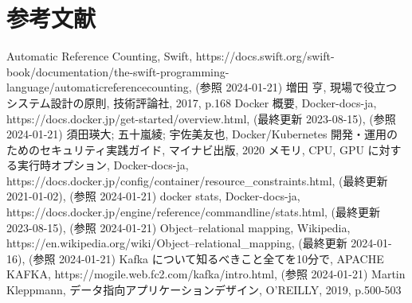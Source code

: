 \documentclass[../../main]{subfiles}
\begin{document}
    \section{参考文献}\label{sec:reference}

    \begin{thebibliography}{99}
         Automatic Reference Counting, Swift, https://docs.swift.org/swift-book/documentation/the-swift-programming-language/automaticreferencecounting, (参照 2024-01-21)
         増田 亨, 現場で役立つシステム設計の原則, 技術評論社, 2017, p.168
         Docker 概要, Docker-docs-ja, https://docs.docker.jp/get-started/overview.html, (最終更新 2023-08-15), (参照 2024-01-21)
         須田瑛大; 五十嵐綾; 宇佐美友也, Docker/Kubernetes 開発・運用のためのセキュリティ実践ガイド, マイナビ出版, 2020
         メモリ, CPU, GPU に対する実行時オプション, Docker-docs-ja, https://docs.docker.jp/config/container/resource\_constraints.html, (最終更新 2021-01-02), (参照 2024-01-21)
         docker stats, Docker-docs-ja, https://docs.docker.jp/engine/reference/commandline/stats.html, (最終更新 2023-08-15), (参照 2024-01-21)
         Object–relational mapping, Wikipedia, https://en.wikipedia.org/wiki/Object–relational\_mapping, (最終更新 2024-01-16), (参照 2024-01-21)
         Kafka について知るべきこと全てを10分で, APACHE KAFKA, https://mogile.web.fc2.com/kafka/intro.html, (参照 2024-01-21)
         Martin Kleppmann, データ指向アプリケーションデザイン, O'REILLY, 2019, p.500-503
    \end{thebibliography}

    \clearpage
\end{document}
